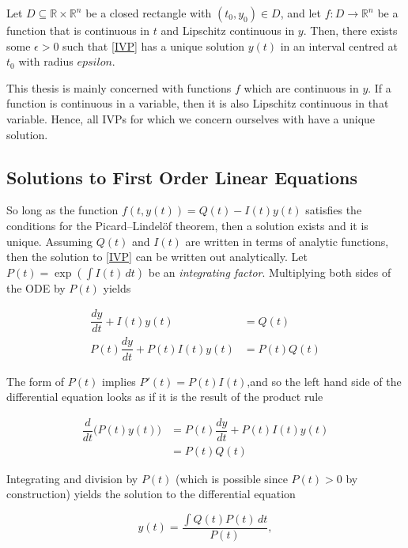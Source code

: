 \begin{theorem}
	Let $D \subseteq \mathbb{R} \times \mathbb{R}^n$ be a closed rectangle with $(t_0, y_0) \in D$, and let $f : D \to \mathbb{R}^n$ be a function that is continuous in $t$ and Lipschitz continuous in $y$.  Then, there exists some $\epsilon>0$ such that \cref{IVP} has a unique solution $y(t)$ in an interval centred at $t_0$ with radius $epsilon$.
\end{theorem}

\noindent This thesis is mainly concerned with functions $f$ which are continuous in $y$.  If a function is continuous in a variable, then it is also Lipschitz continuous in that variable.  Hence, all IVPs for which we concern ourselves with have a unique solution. 


\subsection{Solutions to First Order Linear Equations}

So long as the function $f(t, y(t)) = Q(t) - I(t) y(t)$ satisfies the conditions for the Picard–Lindelöf theorem, then a solution exists and it is unique.  Assuming $Q(t)$ and $I(t)$ are written in terms of analytic functions, then the solution to \cref{IVP} can be written out analytically.  Let $P(t) = \exp(\int I(t) \, dt)$ be an \textit{integrating factor}.  Multiplying both sides of the ODE by $P(t)$ yields

\begin{align}
	\dfrac{dy}{dt} + I(t)y(t) &= Q(t) \\
	P(t)\dfrac{dy}{dt} + P(t)I(t)y(t) &= P(t)Q(t) 
\end{align}

\noindent  The form of $P(t)$ implies $P'(t) = P(t)I(t)$,and so the left hand side of the differential equation looks as if it is the result of the product rule

\begin{align}
 \dfrac{d}{dt} \Big( P(t)y(t) \Big) &= P(t)\dfrac{dy}{dt} + P(t)I(t)y(t) \\
														  &= P(t) Q(t)
\end{align}

\noindent Integrating and division by $P(t)$ (which is possible since $P(t)>0$ by construction) yields the solution to the differential equation

\begin{equation}
	y(t) = \dfrac{\int Q(t) P(t)\, dt}{P(t)},
\end{equation}

